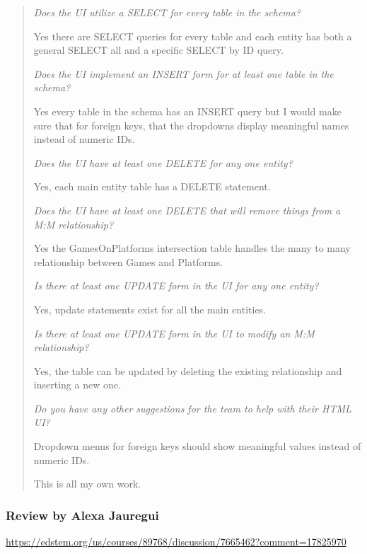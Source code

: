 \documentclass[11pt]{article}
\begin{document}
\begin{quote}
\textit{Does the UI utilize a SELECT for every table in the schema?}

Yes there are SELECT queries for every table and each entity has both a general SELECT all and a specific SELECT by ID query.

\textit{Does the UI implement an INSERT form for at least one table in the schema?}

Yes every table in the schema has an INSERT query but I would make sure that for foreign keys, that the dropdowns display meaningful names instead of numeric IDs.

\textit{Does the UI have at least one DELETE for any one entity?}

Yes, each main entity table has a DELETE statement.

\textit{Does the UI have at least one DELETE that will remove things from a M:M relationship?}

Yes the GamesOnPlatforms intersection table handles the many to many relationship between Games and Platforms.

\textit{Is there at least one UPDATE form in the UI for any one entity?}

Yes, update statements exist for all the main entities.

\textit{Is there at least one UPDATE form in the UI to modify an M:M relationship?}

Yes, the table can be updated by deleting the existing relationship and inserting a new one.

\textit{Do you have any other suggestions for the team to help with their HTML UI?}

Dropdown menus for foreign keys should show meaningful values instead of numeric IDs.

This is all my own work.
\end{quote}

\subsubsection*{Review by Alexa Jauregui}
\url{https://edstem.org/us/courses/89768/discussion/7665462?comment=17825970}
\end{document}

